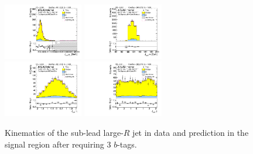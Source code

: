 \begin{figure}[htbp!]
\begin{center}
\includegraphics[width=0.31\textwidth,angle=-90]{figures/boosted/Signal/b77_ThreeTag_Signal_sublHCand_Pt_m.pdf}
\includegraphics[width=0.31\textwidth,angle=-90]{figures/boosted/Signal/b77_ThreeTag_Signal_sublHCand_Mass_s.pdf}\\
\includegraphics[width=0.31\textwidth,angle=-90]{figures/boosted/Signal/b77_ThreeTag_Signal_sublHCand_Eta.pdf}
\includegraphics[width=0.31\textwidth,angle=-90]{figures/boosted/Signal/b77_ThreeTag_Signal_sublHCand_Phi.pdf}
  \caption{Kinematics of the sub-lead large-$R$ jet in data and prediction in the signal region after requiring 3 $b$-tags. }
  \label{fig:boosted-3b-signal-ak10-subl}
\end{center}
\end{figure}

